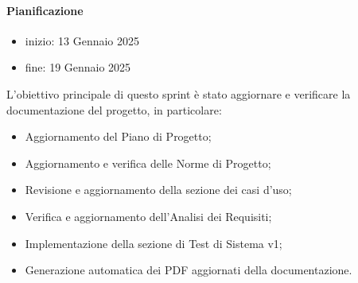 \documentclass{article}
\begin{document}
                \paragraph{Pianificazione}
                \begin{itemize}
                    \item inizio: 13 Gennaio 2025
                    \item fine: 19 Gennaio 2025
                \end{itemize}
                L'obiettivo principale di questo sprint è stato aggiornare e verificare la documentazione del progetto, in particolare:
                \begin{itemize}
                    \item Aggiornamento del Piano di Progetto;
                    \item Aggiornamento e verifica delle Norme di Progetto;
                    \item Revisione e aggiornamento della sezione dei casi d'uso;
                    \item Verifica e aggiornamento dell'Analisi dei Requisiti;
                    \item Implementazione della sezione di Test di Sistema v1;
                    \item Generazione automatica dei PDF aggiornati della documentazione.
                \end{itemize}
\end{document}
